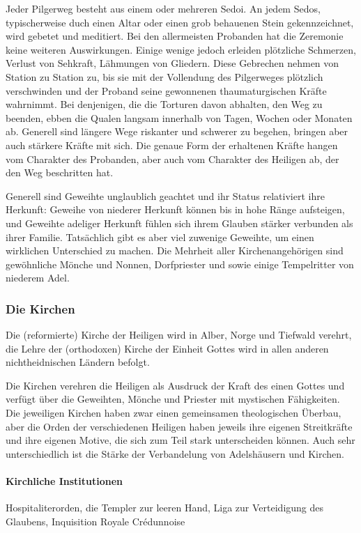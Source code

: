 \documentclass[12pt,twoside,twocolumn,openany]{book}
\begin{document}
	Jeder Pilgerweg besteht aus einem oder mehreren Sedoi. An jedem Sedos, typischerweise duch einen Altar oder einen grob behauenen Stein gekennzeichnet, wird gebetet und meditiert. Bei den allermeisten Probanden hat die Zeremonie keine weiteren Auswirkungen. Einige wenige jedoch erleiden plötzliche Schmerzen, Verlust von Sehkraft, Lähmungen von Gliedern. Diese Gebrechen nehmen von Station zu Station zu, bis sie mit der Vollendung des Pilgerweges plötzlich verschwinden und der Proband seine gewonnenen thaumaturgischen Kräfte wahrnimmt. Bei denjenigen, die die Torturen davon abhalten, den Weg zu beenden, ebben die Qualen langsam innerhalb von Tagen, Wochen oder Monaten ab. Generell sind längere Wege riskanter und schwerer zu begehen, bringen aber auch stärkere Kräfte mit sich. Die genaue Form der erhaltenen Kräfte hangen vom Charakter des Probanden, aber auch vom Charakter des Heiligen ab, der den Weg beschritten hat.
	
	Generell sind Geweihte unglaublich geachtet und ihr Status relativiert ihre Herkunft: Geweihe von niederer Herkunft können bis in hohe Ränge aufsteigen, und Geweihte adeliger Herkunft fühlen sich ihrem Glauben stärker verbunden als ihrer Familie. Tatsächlich gibt es aber viel zuwenige Geweihte, um einen wirklichen Unterschied zu machen. Die Mehrheit aller Kirchenangehörigen sind gewöhnliche Mönche und Nonnen, Dorfpriester und sowie einige Tempelritter von niederem Adel.
	
	\subsubsection{Die Kirchen}
	Die (reformierte) Kirche der Heiligen wird in Alber, Norge und Tiefwald verehrt, die Lehre der (orthodoxen) Kirche der Einheit Gottes wird in allen anderen nichtheidnischen Ländern befolgt.
	
	Die Kirchen verehren die Heiligen als Ausdruck der Kraft des einen Gottes und verfügt über die Geweihten, Mönche und Priester mit mystischen Fähigkeiten. Die jeweiligen Kirchen haben zwar einen gemeinsamen theologischen Überbau, aber die Orden der verschiedenen Heiligen haben jeweils ihre eigenen Streitkräfte und ihre eigenen Motive, die sich zum Teil stark unterscheiden können. Auch sehr unterschiedlich ist die Stärke der Verbandelung von Adelshäusern und Kirchen.
	\paragraph{Kirchliche Institutionen} Hospitaliterorden, die Templer zur leeren Hand, Liga zur Verteidigung des Glaubens, Inquisition Royale Crédunnoise
	
\end{document}

